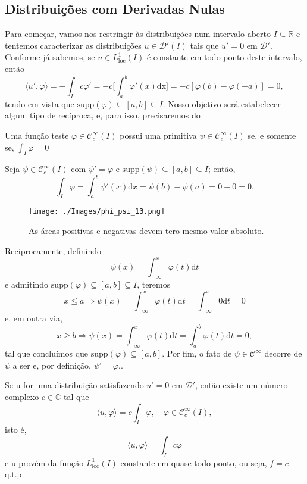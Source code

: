\documentclass[../distribution_theory_notes.tex]{subfiles}
\begin{document}
\subsection{Distribuições com Derivadas Nulas}
Para começar, vamos nos restringir às distribuições num intervalo aberto \(I \subseteq \mathbb{R}\) e tentemos caracterizar as distribuições \(u\in \mathcal{D}'(I)\) tais que \(u'=0\) em \(\mathcal{D}'\). Conforme já sabemos, se \(u\in L_{\mathrm{loc}}^{1}(I)\) é constante em todo ponto deste intervalo, então
\[
	\langle u', \varphi  \rangle = - \int_{I}^{}c\varphi ' = -c \biggl[\int_{a}^{b}\varphi '(x) \mathrm{dx}\biggr] = - c[\varphi (b) - \varphi (+a)] = 0,
\]
tendo em vista que \(\mathrm{supp}(\varphi )\subseteq [a, b]\subseteq I\). Nosso objetivo será estabelecer algum tipo de recíproca, e, para  isso, precisaremos do
\begin{lemma*}
	Uma função teste \(\varphi \in \mathcal{C}_{c}^{\infty}(I)\) possui uma primitiva \(\psi \in \mathcal{C}_{c}^{\infty}(I)\) se, e somente se, \(\int_{I}^{}\varphi = 0\)
\end{lemma*}
\begin{proof*}
	Seja \(\psi \in \mathcal{C}_{c}^{\infty}(I)\) com \(\psi ' = \varphi \)  e \(\mathrm{supp}(\psi )\subseteq [a, b]\subseteq I\); então,
	\[
		\int_{I}^{}\varphi = \int_{a}^{b}\psi '(x) \mathrm{d}x = \psi (b) - \psi (a) = 0-0=0.
	\]
	\begin{figure}[H]
		\begin{center}
			\texttt{[image: ./Images/phi\_psi\_13.png]}
		\end{center}
		\caption{As áreas positivas e negativas devem tero mesmo valor absoluto.}
	\end{figure}


	Reciprocamente, definindo
	\[
		\psi (x) = \int_{-\infty}^{x}\varphi (t) \mathrm{d}t
	\]
	e admitindo \(\mathrm{supp}(\varphi )\subseteq [a, b] \subseteq I\), teremos
	\[
		x\leq a \Rightarrow \psi (x) = \int_{-\infty}^{x}\varphi (t) \mathrm{d}t = \int_{-\infty}^{x}0 \mathrm{d}t = 0
	\]
	e, em outra via,
	\[
		x\geq b \Rightarrow \psi (x) = \int_{-\infty}^{x}\varphi (t) \mathrm{d}t = \int_{a}^{b}\varphi (t) \mathrm{d}t = 0,
	\]
	tal que concluímos que \(\mathrm{supp}(\varphi )\subseteq [a, b]\). Por fim, o fato de \(\psi \in \mathcal{C}^{\infty}\) decorre de \(\psi \) a ser e, por definição, \(\psi ' = \varphi .\). \qedsymbol
\end{proof*}
\begin{theorem*}
	Se u for uma distribuição satisfazendo \(u'= 0\) em \(\mathcal{D}'\), então existe um número complexo \(c\in \mathbb{C}\) tal que
	\[
		\langle u, \varphi  \rangle = c \int_{I}^{}\varphi, \quad \varphi \in \mathcal{C}_{c}^{\infty}(I),
	\]
	isto é,
	\[
		\langle u, \varphi  \rangle = \int_{I}^{}c\varphi
	\]
	e u provém da função \(L_{\mathrm{loc}}^{1}(I)\) constante em quase todo ponto, ou seja, \(f=c\) q.t.p.
\end{theorem*}
\end{document}
